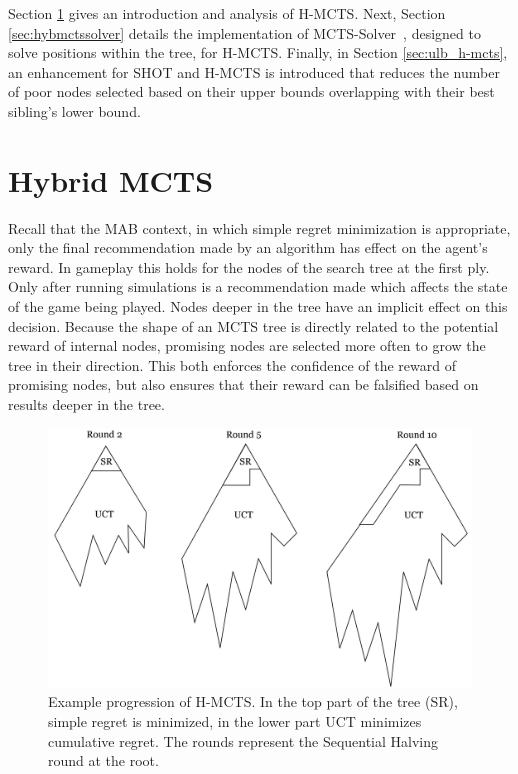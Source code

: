 \documentclass{kecsmstr}
\begin{document}
Section \ref{sec:hybmcts} gives an introduction and analysis of H-MCTS. Next, Section \ref{sec:hybmctssolver} details the implementation of MCTS-Solver~, designed to solve positions within the tree, for H-MCTS. Finally, in Section \ref{sec:ulb_h-mcts}, an enhancement for SHOT and H-MCTS is introduced that reduces the number of poor nodes selected based on their upper bounds overlapping with their best sibling's lower bound.
\newpage
\section{Hybrid MCTS}
\label{sec:hybmcts}

Recall that the MAB context, in which simple regret minimization is appropriate, only the final recommendation made by an algorithm has effect on the agent's reward. In gameplay this holds for the nodes of the search tree at the first ply. Only after running simulations is a recommendation made which affects the state of the game being played. Nodes deeper in the tree have an implicit effect on this decision. Because the shape of an MCTS tree is directly related to the potential reward of internal nodes, promising nodes are selected more often to grow the tree in their direction. This both enforces the confidence of the reward of promising nodes, but also ensures that their reward can be falsified based on results deeper in the tree.

\begin{figure}[ht]
	\centering
	\includegraphics[width=.8\textwidth]{img/H-MCTS.png}
	\caption{Example progression of H-MCTS. In the top part of the tree (SR), simple regret is minimized, in the lower part UCT minimizes cumulative regret. The rounds represent the Sequential Halving round at the root.}
	\label{fig:h-mcts_trees}
\end{figure}
\end{document}
